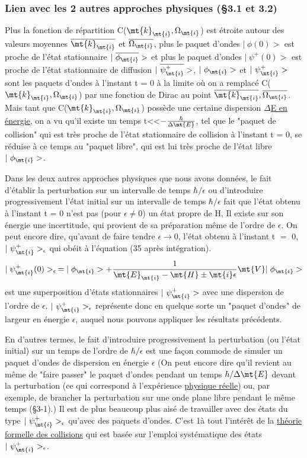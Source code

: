 \subsubsection{Lien avec les 2 autres approches physiques (\S 3.1 et 3.2)} %
Plus la fonction de répartition C($\mt{k}_\mt{i},\Omega_\mt{i}$) est étroite autour
des valeurs moyennes $\overline{\mt{k}_\mt{i}}$ et $\overline{\Omega_\mt{i}}$,
plus le paquet d'ondes $|\ \phi(0)>$ est proche
de l'état stationnaire $|\ \overline{\phi_\mt{i}}>$ et plus le paquet d'ondes $|\ \psi^+(0)>$ est proche
de l'état stationnaire de diffusion $|\ \overline{\psi^+_\mt{i}}>$, $|\ \phi_\mt{i}>$
et $|\ \psi_\mt{i}^+>$ sont les
paquets d'ondes à l'instant t = 0 à la limite où on a remplacé C($\mt{k}_\mt{i},\Omega_\mt{i}$)
par une fonction de Dirac au point $\overline{\mt{k}_\mt{i}},\overline{\Omega_\mt{i}}$.
Mais tant que C($\mt{k}_\mt{i},\Omega_\mt{i}$) possède
une certaine dispersion \ul{$\Delta$E en énergie}, on a vu qu'il existe un temps
t<<$-\frac{\hbar}{\Delta\mt{E}}$, tel que le "paquet de collision" qui est très proche de l'état
stationnaire de collision à l'instant t = 0, se réduise à ce temps au "paquet libre",
qui est lui très proche de l'état libre $|\ \phi_\mt{i}>$.

Dans les deux autres approches physiques que nous avons données,
le fait d'établir la perturbation sur un intervalle de temps $\hbar/\epsilon$ ou d'introduire
progressivement l'état initial sur un intervalle de temps $\hbar/\epsilon$
fait que l'état obtenu à l'instant t = 0 n'est pas (pour $\epsilon\neq0$) un état
propre de H, Il existe sur son énergie une incertitude, qui provient de sa
préparation même de l'ordre de $\epsilon$. On peut encore dire, qu'avant de faire
tendre $\epsilon\to0$, l'état obtenu à l'instant t $=$ 0, $|\ \psi^+_\mt{i}>_\epsilon$ qui obéit à l'équation (35 après intégration).
\[
|\;\psi_\mt{i}^+(0)>_\epsilon\,=|\;\phi_\mt{i}>+\frac{1}{\mt{E}_\mt{i}-\mt{H}\pm\mt{i}\epsilon}\mt{ V }|\;\phi_\mt{i}>
\]
est une superposition d'états stationnaires $|\ \psi^+_\mt{i}>$ avec une dispersion
de l'ordre de $\epsilon$. $|\ \psi^+_\mt{i}>_\epsilon$ représente donc en quelque sorte un "paquet
d'ondes" de largeur en énergie $\epsilon$, auquel nous pouvons appliquer les résultats précédents.

\vspace{1.5cm}
En d'autres termes, le fait d'introduire progressivement la
perturbation (ou l'état initial) sur un temps de l'ordre de $\hbar/\epsilon$ est une
façon commode de simuler un paquet d'ondes de dispersion en énergie $\epsilon$ {\footnotesize (On peut encore dire qu'il revient au même de "faire passer" le paquet
d'ondes pendant un temps $\hbar/\Delta\mt{E}$ devant la perturbation (ce qui correspond
à l'expérience \ul{physique réelle}) ou, par exemple, de brancher la perturbation sur
une onde plane libre pendant le même temps (\S 3-1).)}
Il est de plus beaucoup plus aisé de travailler avec des états du type
$|\ \psi^+_\mt{i}>_\epsilon$ qu'avec des paquets d'ondes. C'est 1à tout l'intérêt de la
\ul{théorie formelle des collisions} qui est basée sur l'emploi systématique
des états $|\ \psi^+_\mt{i}>_\epsilon$.

